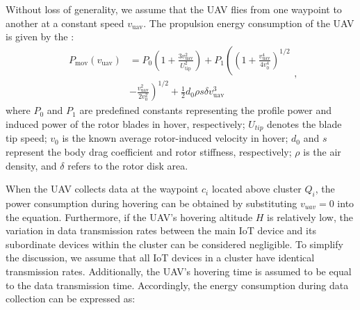 \documentclass[sigconf]{acmart}
\begin{document}
Without loss of generality, we assume that the UAV flies from one waypoint to another at a constant speed $v_{\mathrm{uav}}$. The propulsion energy consumption of the UAV is given by the \cite{13-UavenergyModel}: 
\begin{equation}
    \ \begin{aligned}P_{\mathrm{mov}}(v_{\mathrm{uav}})&=P_0\left(1+\frac{3v_{\mathrm{uav}}^2}{U_{\mathrm{tip}}^2}\right)+P_1\left(\left(1+\frac{v_{\mathrm{uav}}^4}{4v_0^4}\right)^{1/2}\right.\\&-\left.\frac{v_{\mathrm{uav}}^2}{2v_0^2}\right)^{1/2}+\frac12d_0\rho s\delta v_{\mathrm{uav}}^3\end{aligned},
\end{equation}
where $P_0$ and $P_1$ are predefined constants representing the profile power and induced power of the rotor blades in hover, respectively; $U_{tip}$ denotes the blade tip speed; $v_0$ is the known average rotor-induced velocity in hover; $d_0$ and $s$ represent the body drag coefficient and rotor stiffness, respectively; $\rho$ is the air density, and $\delta$ refers to the rotor disk area. 

When the UAV collects data at the waypoint $c_i$ located above cluster $Q_i$, the power consumption during hovering can be obtained by substituting $v_{uav}=0$ into the equation. Furthermore, if the UAV's hovering altitude $H$ is relatively low, the variation in data transmission rates between the main IoT device and its subordinate devices within the cluster can be considered negligible. To simplify the discussion, we assume that all IoT devices in a cluster have identical transmission rates. Additionally, the UAV's hovering time is assumed to be equal to the data transmission time. Accordingly, the energy consumption during data collection can be expressed as:
\end{document}
